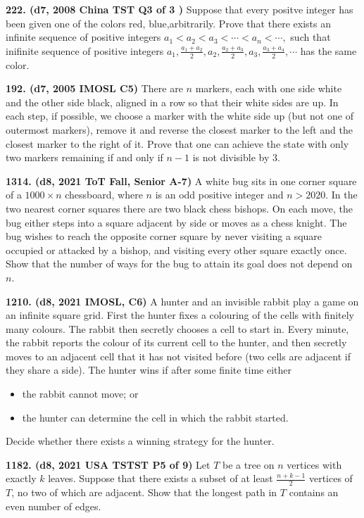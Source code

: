 \documentclass{article}
\begin{document}
\textbf{222. (\color{red}d7\color{black}, 2008 China TST Q3 of 3 )} Suppose that every positve integer has been given one of the colors red, blue,arbitrarily. Prove that there exists an infinite sequence of positive integers $ a_{1} < a_{2} < a_{3} < \cdots < a_{n} < \cdots,$ such that inifinite sequence of positive integers $ a_{1},\frac {a_{1} + a_{2}}{2},a_{2},\frac {a_{2} + a_{3}}{2},a_{3},\frac {a_{3} + a_{4}}{2},\cdots$ has the same color.

\textbf{192. (\color{red}d7\color{black}, 2005 IMOSL C5)} There are \(n\) markers, each with one side white and the other side black, aligned in a row so that their white sides are up. In each step, if possible, we choose a marker with the white side up (but not one of outermost markers), remove it and reverse the closest marker to the left and the closest marker to the right of it. Prove that one can achieve the state with only two markers remaining if and only if \(n-1\) is not divisible by 3.

\textbf{1314. (\color{red}d8\color{black}, 2021 ToT Fall, Senior A-7)} A white bug sits in one corner square of a $1000 \times n$ chessboard, where $n$ is an odd positive integer and $n > 2020$. In the two nearest corner squares there are two black chess bishops. On each move, the bug either steps into a square adjacent by side or moves as a chess knight. The bug wishes to reach the opposite corner square by never visiting a square occupied or attacked by a bishop, and visiting every other square exactly once. Show that the number of ways for the bug to attain its goal does not depend on $n$.

\textbf{1210. (\color{red}d8\color{black}, 2021 IMOSL, C6)} A hunter and an invisible rabbit play a game on an infinite square grid. First the hunter fixes a colouring of the cells with finitely many colours. The rabbit then secretly chooses a cell to start in. Every minute, the rabbit reports the colour of its current cell to the hunter, and then secretly moves to an adjacent cell that it has not visited before (two cells are adjacent if they share a side). The hunter wins if after some finite time either
\begin{itemize}
        \item the rabbit cannot move; or
        \item the hunter can determine the cell in which the rabbit started.
\end{itemize}
Decide whether there exists a winning strategy for the hunter.

\textbf{1182. (\color{red}d8\color{black}, 2021 USA TSTST P5 of 9)} Let $T$ be a tree on $n$ vertices with exactly $k$ leaves. Suppose that there exists a subset of at least $\frac{n+k-1}{2}$ vertices of $T$, no two of which are adjacent. Show that the longest path in $T$ contains an even number of edges.
\end{document}
